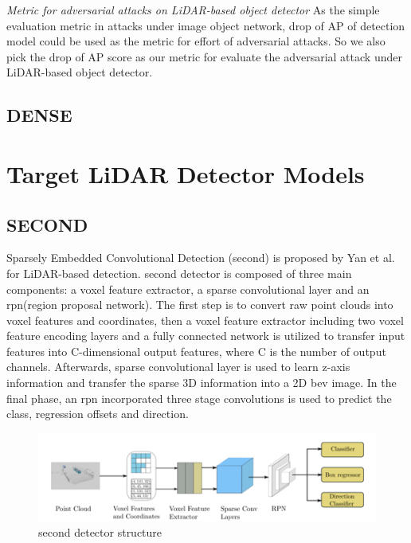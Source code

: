 \textit{Metric for adversarial attacks on LiDAR-based object detector}
As the simple evaluation metric in attacks\cite{xie_adversarial_2017,liu_adversarial_2019,li_robust_2019,zhang_towards_2019,wei_transferable_2019} under image object network, drop of AP of detection model could be used as the metric for effort of adversarial attacks. So we also pick the drop of AP score as our metric for evaluate the adversarial attack under LiDAR-based object detector.
\subsection{DENSE}
\section{Target LiDAR Detector Models}
\subsection{SECOND}
Sparsely Embedded Convolutional Detection (\acrshort{second}) is proposed by Yan et al. for LiDAR-based detection\cite{yan_second_2018}. \acrshort{second} detector is composed of three main components: a voxel feature extractor, a sparse convolutional layer and an \acrshort{rpn}(region proposal network). The first step is to convert raw point clouds into voxel features and coordinates, then a voxel feature extractor including two voxel feature encoding layers and a fully connected network is utilized to transfer input features into C-dimensional output features, where C is the number of output channels. Afterwards, sparse convolutional layer is used to learn z-axis information and transfer the sparse 3D information into a 2D \acrshort{bev} image. In the final phase, an \acrshort{rpn} incorporated three stage convolutions is used to predict the class, regression offsets and direction. 
\begin{figure}[!htbp]
\centering
\includegraphics[scale=1]{Graphics/SECOND.png}
\caption{\acrshort{second} detector structure}
\label{fig:SECOND}
\end{figure}
